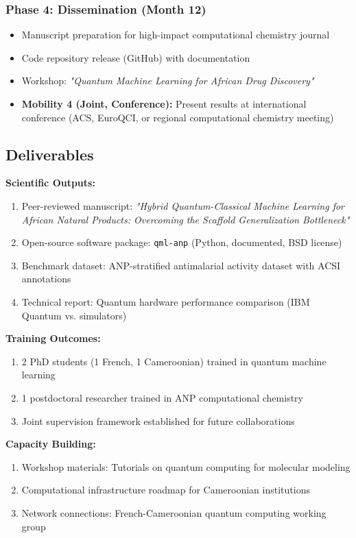 \documentclass[11pt,a4paper]{article}
\begin{document}
\subsubsection{Phase 4: Dissemination (Month 12)}
\begin{itemize}
    \item Manuscript preparation for high-impact computational chemistry journal
    \item Code repository release (GitHub) with documentation
    \item Workshop: \textit{"Quantum Machine Learning for African Drug Discovery"}
    \item \textbf{Mobility 4 (Joint, Conference):} Present results at international conference (ACS, EuroQCI, or regional computational chemistry meeting)
\end{itemize}

\subsection{Deliverables}

\textbf{Scientific Outputs:}
\begin{enumerate}
    \item Peer-reviewed manuscript: \textit{"Hybrid Quantum-Classical Machine Learning for African Natural Products: Overcoming the Scaffold Generalization Bottleneck"}
    \item Open-source software package: \texttt{qml-anp} (Python, documented, BSD license)
    \item Benchmark dataset: ANP-stratified antimalarial activity dataset with ACSI annotations
    \item Technical report: Quantum hardware performance comparison (IBM Quantum vs. simulators)
\end{enumerate}

\textbf{Training Outcomes:}
\begin{enumerate}
    \item 2 PhD students (1 French, 1 Cameroonian) trained in quantum machine learning
    \item 1 postdoctoral researcher trained in ANP computational chemistry
    \item Joint supervision framework established for future collaborations
\end{enumerate}

\textbf{Capacity Building:}
\begin{enumerate}
    \item Workshop materials: Tutorials on quantum computing for molecular modeling
    \item Computational infrastructure roadmap for Cameroonian institutions
    \item Network connections: French-Cameroonian quantum computing working group
\end{enumerate}
\end{document}
